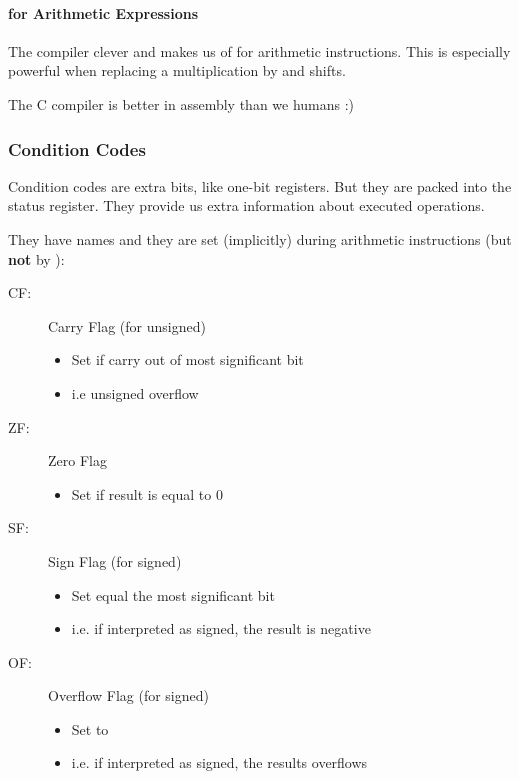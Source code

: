 \paragraph{ for Arithmetic Expressions}
The compiler clever and makes us of  for arithmetic instructions. This is especially powerful when replacing a multiplication by  and shifts.

The C compiler is better in assembly than we humans :)

\subsubsection{Condition Codes}
Condition codes are extra bits, like one-bit registers. But they are packed into the status register. They provide us extra information about executed operations.

They have names and they are set (implicitly) during arithmetic instructions (but \textbf{not} by ):
\begin{description}
    \item[CF:] Carry Flag (for unsigned)
        \begin{itemize}
            \item Set if carry out of most significant bit
            \item i.e unsigned overflow
        \end{itemize}
    \item[ZF:] Zero Flag
        \begin{itemize}
            \item Set if result is equal to $0$
        \end{itemize}
    \item[SF:] Sign Flag (for signed)
        \begin{itemize}
            \item Set equal the most significant bit
            \item i.e. if interpreted as signed, the result is negative
        \end{itemize}
    \item[OF:] Overflow Flag (for signed)
        \begin{itemize}
            \item Set to 
            \item i.e. if interpreted as signed, the results overflows
        \end{itemize}
\end{description}

